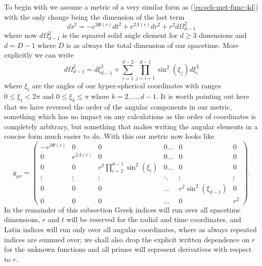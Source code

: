 \documentclass[12pt]{article}
\numberwithin{equation}{section}
\numberwithin{figure}{section}
\begin{document}
To begin with we assume a metric of a very similar form as (\ref{eq:sch-met-func-4d}) with the only change being the dimension of the last term
\begin{equation}
	ds^2= -e^{2\Phi(r)}dt^2 + e^{2\Lambda(r)}dr^2 + r^2 d{\Omega}^2_{d-1}
\end{equation}
where now $d{\Omega}^2_{d-1}$ is the squared solid angle element for $d\ge 3$ dimensions and $d=D-1$ where $D$ is as always the total dimension of our spacetime. More explicitly we can write
\begin{equation}
	d{\Omega}^2_{d-1} = d\xi^2_{d-1} + \sum_{i=1}^{d-2}\prod_{j=i+1}^{d-1}\sin^2(\xi_j)d\xi^2_i
\end{equation}
where $\xi_i$ are the angles of our hyper-spherical coordinates with ranges $0\le \xi_1 <2\pi$ and $0\le \xi_k \le \pi$ where $k=2,\dots,d-1$. It is worth pointing out here that we have reversed the order of the angular components in our metric, something which has no impact on any calculations as the order of coordinates is completely arbitrary, but something that makes writing the angular elements in a concise form much easier to do. With this our metric now looks like
\begin{equation}
		g_{\mu\nu}= 
		\begin{pmatrix}
		-e^{2\Phi(r)} & 0 & 0 & 0\dots & 0 & 0 \\
		0 & e^{2\Lambda(r)} & 0 & 0\dots & 0 & 0 \\
		0 & 0 & r^2\prod_{i=2}^{d-1}\sin^2(\xi_i) & 0\dots & 0 & 0 \\
		\vdots & \vdots & \vdots & \ddots & \vdots & \vdots \\
		0 & 0 & 0 & \dots & r^2\sin^2(\xi_{d-1}) & 0 \\
		0 & 0 & 0 & \dots & 0 & r^2
	\end{pmatrix}.
\end{equation}
In the remainder of this subsection Greek indices will run over all spacetime dimensions, $r$ and $t$ will be reserved for the radial and time coordinates, and Latin indices will run only over all angular coordinates, where as always repeated indices are summed over; we shall also drop the explicit written dependence on $r$ for the unknown functions and all primes will represent derivatives with respect to $r$.
\end{document}
